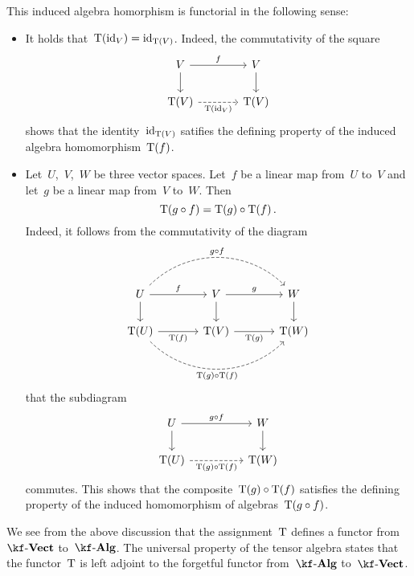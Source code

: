 \begin{recall}
\begin{description}
			This induced algebra homorphism is functorial in the following sense:
			\begin{itemize}
				\item
					It holds that~$\operatorname{T}(\mathrm{id}_V) = \mathrm{id}_{\operatorname{T}(V)}$.
					Indeed, the commutativity of the square 
					\[
						\begin{tikzcd}[column sep = large]
							V
							\arrow{r}[above]{f}
							\arrow{d}
							&
							V
							\arrow{d}
							\\
							\Tensor(V)
							\arrow[dashed]{r}[below]{\Tensor(\id_V)}
							&
							\Tensor(V)
						\end{tikzcd}
					\]
					shows that the identity~$\mathrm{id}_{\operatorname{T}(V)}$ satifies the defining property of the induced algebra homomorphism~$\operatorname{T}(f)$.
				\item
					Let~$U$,~$V$,~$W$ be three vector spaces.
					Let~$f$ be a linear map from~$U$ to~$V$ and let~$g$ be a linear map from~$V$ to~$W$.
					Then
					\[
						\operatorname{T}(g \circ f)
						=
						\operatorname{T}(g) \circ \operatorname{T}(f) \,.
					\]
					Indeed, it follows from the commutativity of the diagram
					\[
						\begin{tikzcd}[column sep = large]
							U
							\arrow[dashed, bend left=45]{rr}[above]{g \circ f}
							\arrow{r}[above]{f}
							\arrow{d}
							&
							V
							\arrow{r}[above]{g}
							\arrow{d}
							&
							W
							\arrow{d}
							\\
							\Tensor(U)
							\arrow{r}[below]{\Tensor(f)}
							\arrow[dashed, bend right=45]{rr}[below]{\Tensor(g) \circ \Tensor(f)}
							&
							\Tensor(V)
							\arrow{r}[below]{\Tensor(g)}
							&
							\Tensor(W)
						\end{tikzcd}
					\]
					that the subdiagram
					\[
						\begin{tikzcd}[column sep = huge]
							U
							\arrow{r}[above]{g \circ f}
							\arrow{d}
							&
							W
							\arrow{d}
							\\
							\Tensor(U)
							\arrow[dashed]{r}[below]{\Tensor(g) \circ \Tensor(f)}
							&
							\Tensor(W)
						\end{tikzcd}
					\]
					commutes.
					This shows that the composite~$\operatorname{T}(g) \circ \operatorname{T}(f)$ satisfies the defining property of the induced homomorphism of algebras~$\operatorname{T}(g \circ f)$.
			\end{itemize}
			
			We see from the above discussion that the assignment~$\operatorname{T}$ defines a functor from~$\cVect{\kf}$ to~$\cAlg{\kf}$.
			The universal property of the tensor algebra states that the functor~$\operatorname{T}$ is left adjoint to the forgetful functor from~$\cAlg{\kf}$ to~$\cVect{\kf}$.
		

\end{description}
\end{recall}
